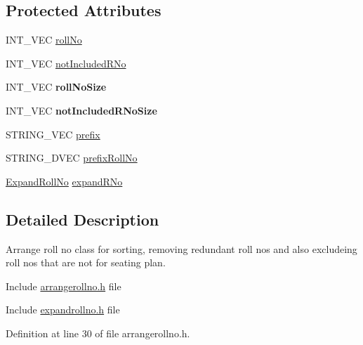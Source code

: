 \subsection*{\-Protected \-Attributes}
\begin{DoxyCompactItemize}
\item 
\-I\-N\-T\-\_\-\-V\-E\-C \hyperlink{classArrangeRollNo_ad75d3ee3f709606da5b4871098c3e978}{roll\-No}
\item 
\-I\-N\-T\-\_\-\-V\-E\-C \hyperlink{classArrangeRollNo_a1f6740950e3180731b74c3ecdc19b98c}{not\-Included\-R\-No}
\item 
\hypertarget{classArrangeRollNo_ab39f82c658365388d106b3dcc18e69fb}{\-I\-N\-T\-\_\-\-V\-E\-C {\bfseries roll\-No\-Size}}\label{da/de9/classArrangeRollNo_ab39f82c658365388d106b3dcc18e69fb}

\item 
\hypertarget{classArrangeRollNo_a728b87c54815f5393e93da5909ed90b2}{\-I\-N\-T\-\_\-\-V\-E\-C {\bfseries not\-Included\-R\-No\-Size}}\label{da/de9/classArrangeRollNo_a728b87c54815f5393e93da5909ed90b2}

\item 
\-S\-T\-R\-I\-N\-G\-\_\-\-V\-E\-C \hyperlink{classArrangeRollNo_ac70b1f6e601cc5786ef339a38ae18c6f}{prefix}
\item 
\-S\-T\-R\-I\-N\-G\-\_\-D\-V\-E\-C \hyperlink{classArrangeRollNo_aa0401159b5d59c7afe77980a391a9a0a}{prefix\-Roll\-No}
\item 
\hyperlink{classExpandRollNo}{\-Expand\-Roll\-No} \hyperlink{classArrangeRollNo_a7ddd59b57f85cf6fea265d38c284df92}{expand\-R\-No}
\end{DoxyCompactItemize}


\subsection{\-Detailed \-Description}
\-Arrange roll no class for sorting, removing redundant roll nos and also excludeing roll nos that are not for seating plan. 

\-Include \hyperlink{arrangerollno_8h}{arrangerollno.\-h} file

\-Include \hyperlink{expandrollno_8h}{expandrollno.\-h} file 

\-Definition at line 30 of file arrangerollno.\-h.



